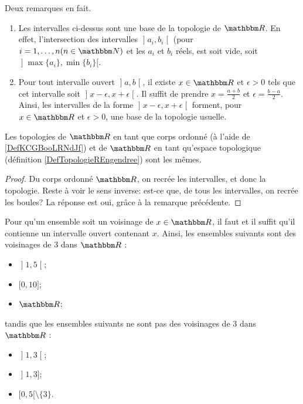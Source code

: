\begin{remark} \label{RemIntervallesBaseTopoR}
  Deux remarques en fait.
  \begin{enumerate}
  \item
    Les intervalles ci-dessus sont une base de la topologie de \( \eR \). En effet, l'intersection des intervalles \( \mathopen] a_i, b_i \mathclose[ \) (pour \( i = 1,\ldots, n (n \in \eN) \) et les \( a_i \) et \( b_i \) réels, est soit vide, soit \( \mathopen] \max\{a_i\}, \min\{b_i\}[ \).
  \item
    Pour tout intervalle ouvert \( \mathopen]a,b\mathclose[ \), il existe \( x \in \eR \) et \( \epsilon > 0 \) tels que cet intervalle soit \( \mathopen]x - \epsilon,x+\epsilon\mathclose[ \). Il suffit de prendre \( x = \frac{a+b} 2 \) et \( \epsilon = \frac{b-a}2 \). Ainsi, les intervalles de la forme \( \mathopen] x - \epsilon, x + \epsilon \mathclose[ \) forment, pour \( x \in \eR \) et \( \epsilon > 0 \), une base de la topologie usuelle.
  \end{enumerate}
\end{remark}

\begin{proposition} \label{TopologieR_ord_top}
  Les topologies de \( \eR \) en tant que corps ordonné (à l'aide de \ref{DefKCGBooLRNdJf}) et de \( \eR \) en tant qu'espace topologique (définition \ref{DefTopologieREngendree}) sont les mêmes.
\end{proposition}

\begin{proof}
  Du corps ordonné \( \eR \), on recrée les intervalles, et donc la topologie. Reste à voir le sens inverse: est-ce que, de tous les intervalles, on recrée les boules? La réponse est oui, grâce à la remarque précédente.
\end{proof}

\begin{example}
  Pour qu'un ensemble soit un voisinage de \( x \in \eR \), il faut et il suffit qu'il contienne un intervalle ouvert contenant \( x \). Ainsi, les ensembles suivants sont des voisinages de \( 3 \) dans \( \eR\) :
  \begin{itemize}
  \item
    \(\mathopen] 1 , 5 \mathclose[\);
  \item
    \(\mathopen[ 0 , 10 \mathclose]\);
  \item
    \(\eR\);
  \end{itemize}
  tandis que les ensembles suivants ne sont pas des voisinages de \(3\) dans \(\eR\) :
  \begin{itemize}
  \item
    \(\mathopen] 1 , 3 \mathclose[\);
  \item
    \(\mathopen] 1 , 3 \mathclose]\);
  \item
    \(\mathopen[ 0 , 5 [\setminus\{ 3 \}\).
  \end{itemize}
\end{example}

